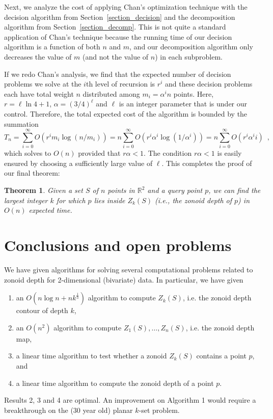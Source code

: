 \documentclass{elsart}
\newtheorem{theorem}{Theorem}
\begin{document}
Next, we analyze the cost of applying Chan's optimization technique
with the decision algorithm from Section~\ref{section_decision} and
the decomposition algorithm from Section~\ref{section_decomp}.  This
is not quite a standard application of Chan's technique because the
running time of our decision algorithm is a function of both $n$ and
$m$, and our decomposition algorithm only decreases the value of $m$
(and not the value of $n$) in each subproblem. 

If we redo Chan's analysis, we find that the expected number of
decision problems we solve at the $i$th level of recursion is $r^i$
and these decision problems each have total weight $n$ distributed
among $m_i=\alpha^i n$ points.  Here, $r=\ell\ln4+1$,
$\alpha=(3/4)^\ell$ and $\ell$ is an integer parameter that is under
our control.  Therefore, the total expected cost of the algorithm is
bounded by the summation
\[
   T_n = \sum_{i=0}^\infty O\left(r^im_i\log (n/m_i)\right)
   = n\sum_{i=0}^\infty O\left(r^i\alpha^i \log(1/\alpha^i)\right)
   = n\sum_{i=0}^\infty O\left(r^i\alpha^i i\right) \enspace ,
\]
which solves to $O(n)$ provided that $r\alpha < 1$.  The condition
$r\alpha < 1$ is easily ensured by choosing a sufficiently large
value of $\ell$.  This completes the proof of our final theorem:

\begin{theorem}\label{theorem_final}
Given a set $S$ of $n$ points in $\mathbb{R}^2$ and a query point $p$,
we can find the largest integer $k$ for which $p$ lies inside $Z_k(S)$
(i.e., the zonoid depth of $p$) in $O(n)$ expected time. 
\end{theorem}

\section{Conclusions and open problems}\label{section_conclusions_and_open_problems}

We have given algorithms for solving several computational problems
related to zonoid depth for 2-dimensional (bivariate) data.
In particular,  we have given 

\begin{enumerate}
\item an $O(n\log n+nk^{\frac{1}{3}})$ algorithm to compute $Z_k(S)$, i.e. the zonoid depth contour of depth $k$,	
\item an $O(n^2)$ algorithm to compute $Z_1(S),\ldots,Z_n(S)$, i.e. the zonoid depth map,
\item a linear time algorithm to test whether a zonoid $Z_k(S)$
contains a point $p$, and
\item a linear time algorithm to compute the zonoid depth of a point $p$.
\end{enumerate}
Results 2, 3 and 4 are optimal. An improvement on Algorithm 1 would require a breakthrough on the (30 year old) planar $k$-set problem. 
\end{document}
